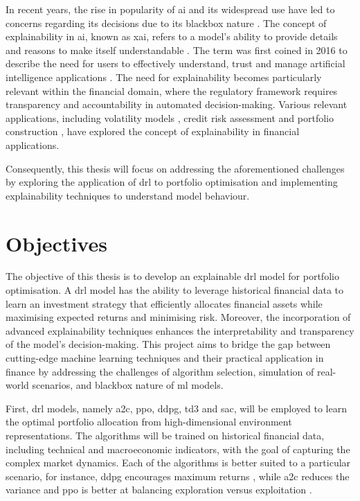 In recent years, the rise in popularity of \acrfull{ai} and its widespread use have led to concerns regarding its decisions due to its \gls{blackbox} nature \cite{Bathaee2018TheAI}. The concept of explainability in \acrshort{ai}, known as \acrfull{xai}, refers to a model's ability to provide details and reasons to make itself understandable \cite{BarredoArrieta2019}. The term was first coined in 2016 to describe the need for users to effectively understand, trust and manage artificial intelligence applications \cite{Gunning2019}. The need for explainability becomes particularly relevant within the financial domain, where the regulatory framework requires transparency and accountability in automated decision-making. Various relevant applications, including volatility models \cite{Brigo2021}, credit risk assessment \cite{GarciaCespedes2025} and portfolio construction \cite{Cortes2024}, have explored the concept of explainability in financial applications. 

Consequently, this thesis will focus on addressing the aforementioned challenges by exploring the application of \acrfull{drl} to portfolio optimisation and implementing explainability techniques to understand model behaviour.

\section{Objectives} \label{sec:introduction-objectives}

The objective of this thesis is to develop an explainable \acrshort{drl} model for portfolio optimisation. A \acrshort{drl} model has the ability to leverage historical financial data to learn an investment strategy that efficiently allocates financial assets while maximising expected returns and minimising risk. Moreover, the incorporation of advanced explainability techniques enhances the interpretability and transparency of the model's decision-making. This project aims to bridge the gap between cutting-edge machine learning techniques and their practical application in finance by addressing the challenges of algorithm selection, simulation of real-world scenarios, and \gls{blackbox} nature of \acrshort{ml} models.

First, \acrshort{drl} models, namely \acrfull{a2c}, \acrfull{ppo}, \acrfull{ddpg}, \acrfull{td3} and \acrfull{sac}, will be employed to learn the optimal portfolio allocation from high-dimensional environment representations. The algorithms will be trained on historical financial data, including technical and macroeconomic indicators, with the goal of capturing the complex market dynamics. Each of the algorithms is better suited to a particular scenario, for instance, \acrshort{ddpg} encourages maximum returns \cite{Lillicrap2015}, while \acrshort{a2c} reduces the variance \cite{Mnih2016} and \acrshort{ppo} is better at balancing \gls{exploration} versus \gls{exploitation} \cite{Schulman2017}.

